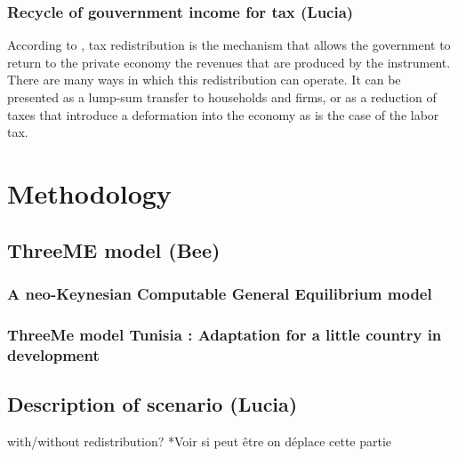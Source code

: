 \documentclass[
]{article}
\begin{document}
\hypertarget{recycle-of-gouvernment-income-for-tax-lucia}{%
\subsubsection{Recycle of gouvernment income for tax
(Lucia)}\label{recycle-of-gouvernment-income-for-tax-lucia}}

According to \textcite{goulder}, tax redistribution is the mechanism
that allows the government to return to the private economy the revenues
that are produced by the instrument. There are many ways in which this
redistribution can operate. It can be presented as a lump-sum transfer
to households and firms, or as a reduction of taxes that introduce a
deformation into the economy as is the case of the labor tax.

\hypertarget{methodology}{%
\section{Methodology}\label{methodology}}

\hypertarget{threeme-model-bee}{%
\subsection{ThreeME model (Bee)}\label{threeme-model-bee}}

\hypertarget{a-neo-keynesian-computable-general-equilibrium-model}{%
\subsubsection{A neo-Keynesian Computable General Equilibrium
model}\label{a-neo-keynesian-computable-general-equilibrium-model}}

\hypertarget{threeme-model-tunisia-adaptation-for-a-little-country-in-development}{%
\subsubsection{ThreeMe model Tunisia : Adaptation for a little country
in
development}\label{threeme-model-tunisia-adaptation-for-a-little-country-in-development}}

\hypertarget{description-of-scenario-lucia}{%
\subsection{Description of scenario
(Lucia)}\label{description-of-scenario-lucia}}

with/without redistribution? *Voir si peut être on déplace cette partie
\end{document}

